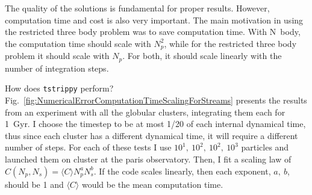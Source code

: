         The quality of the solutions is fundamental for proper results. However, computation time and cost is also very important. The main motivation in using the restricted three body problem was to save computation time. With N~body, the computation time should scale with $N_p^2$, while for the restricted three body problem it should scale with $N_p$. For both, it should scale linearly with the number of integration steps. 

        How does \texttt{tstrippy} perform? Fig.~\ref{fig:NumericalErrorComputationTimeScalingForStreams} presents the results from an experiment with all the globular clusters, integrating them each for 1~Gyr. I choose the timestep to be at most 1/20 of each internal dynamical time, thus since each cluster has a different dynamical time, it will require a different number of steps. For each of these tests I use $10^1,~10^2,~10^2,~10^3$ particles and launched them on cluster at the paris observatory. Then, I fit a scaling law of $C(N_p,N_s) = \langle C\rangle N_p^a N_s^b$. If the code scales linearly, then each exponent, $a,~b$, should be 1 and $\langle C\rangle$ would be the mean computation time. 
        
